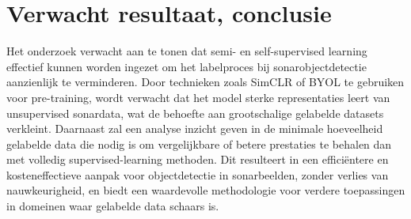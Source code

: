 \section{Verwacht resultaat, conclusie}%
\label{sec:verwachte_resultaten}

Het onderzoek verwacht aan te tonen dat semi- en self-supervised learning effectief kunnen worden ingezet om het labelproces bij sonarobjectdetectie aanzienlijk te verminderen. Door technieken zoals SimCLR of BYOL te gebruiken voor pre-training, wordt verwacht dat het model sterke representaties leert van unsupervised sonardata, wat de behoefte aan grootschalige gelabelde datasets verkleint. Daarnaast zal een analyse inzicht geven in de minimale hoeveelheid gelabelde data die nodig is om vergelijkbare of betere prestaties te behalen dan met volledig supervised-learning methoden. Dit resulteert in een efficiëntere en kosteneffectieve aanpak voor objectdetectie in sonarbeelden, zonder verlies van nauwkeurigheid, en biedt een waardevolle methodologie voor verdere toepassingen in domeinen waar gelabelde data schaars is.
